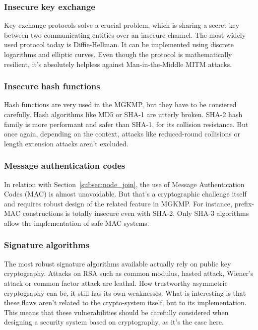 \subsubsection{Insecure key exchange}

Key exchange protocols solve a crucial problem, which is sharing a secret key between two communicating entities over an insecure channel. The most widely used protocol today is Diffie-Hellman. It can be implemented using discrete logarithms and elliptic curves. Even though the protocol is mathematically resilient, it's absolutely helpless against Man-in-the-Middle MITM attacks.

\subsubsection{Insecure hash functions}

Hash functions are very used in the MGKMP, but they have to be consiered carefully. Hash algorithms like MD5 or SHA-1 are utterly broken. SHA-2 hash family is more performant and safer than SHA-1, for its collision resistance. But once again, depending on the context, attacks like reduced-round collisions \cite{chowdhury_new_2008} or length extension attacks aren't excluded.

\subsubsection{Message authentication codes}

In relation with Section~\ref{subsec:node_join}, the use of Message Authentication Codes (MAC) is almost unavoidable. But that's a cryptographic challenge itself \cite{debian} and requires robust design of the related feature in MGKMP. For instance, prefix-MAC constructions is totally insecure even with SHA-2. Only SHA-3 algorithms allow the implementation of safe MAC systems.

\subsubsection{Signature algorithms}

The most robust signature algorithms available actually rely on public key cryptography. Attacks on RSA such as common modulus, hasted attack, Wiener's attack or common factor attack are leathal. How trustworthy asymmetric cryptography can be, it still has its own weaknesses. What is interesting is that these flaws aren't related to the crypto-system itself, but to its implementation. This means that these vulnerabilities should be carefully considered when designing a security system based on cryptography, as it's the case here.

